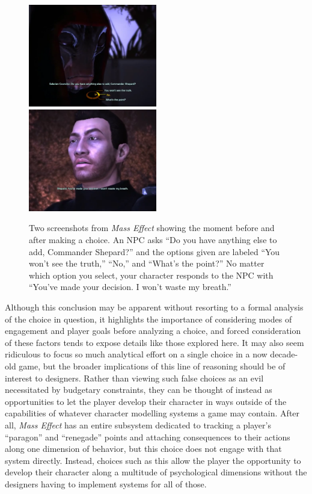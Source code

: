 \documentclass[arts,article,submit,moreauthors,pdftex,10pt,a4paper]{Definitions/mdpi}
\begin{document}
\begin{figure}
  \includegraphics[width=0.5\textwidth]{fig/anything_else_to_add_1.png}
  \includegraphics[width=0.5\textwidth]{fig/made_your_decision_1.png}
  \caption{Two screenshots from \emph{Mass Effect} showing the moment before and after making a choice. An NPC asks ``Do you have anything else to add, Commander Shepard?'' and the options given are labeled ``You won't see the truth,'' ``No,'' and ``What's the point?'' No matter which option you select, your character responds to the NPC with ``You've made your decision. I won't waste my breath.''}
  \label{fig:ME_false}
\end{figure}

Although this conclusion may be apparent without resorting to a formal analysis of the choice in question, it highlights the importance of considering modes of engagement and player goals before analyzing a choice, and forced consideration of these factors tends to expose details like those explored here.
%
It may also seem ridiculous to focus so much analytical effort on a single choice in a now decade-old game, but the broader implications of this line of reasoning should be of interest to designers.
%
Rather than viewing such false choices as an evil necessitated by budgetary constraints, they can be thought of instead as opportunities to let the player develop their character in ways outside of the capabilities of whatever character modelling systems a game may contain.
%
After all, \emph{Mass Effect} has an entire subsystem dedicated to tracking a player's ``paragon'' and ``renegade'' points and attaching consequences to their actions along one dimension of behavior, but this choice does not engage with that system directly.
%
Instead, choices such as this allow the player the opportunity to develop their character along a multitude of psychological dimensions without the designers having to implement systems for all of those.
\end{document}
